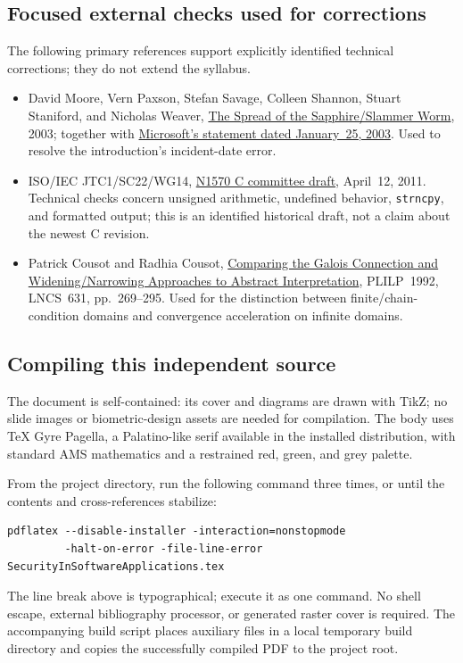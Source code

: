 \documentclass[11pt,a4paper]{article}
\numberwithin{figure}{section}
\begin{document}
\subsection{Focused external checks used for corrections}
The following primary references support explicitly identified technical corrections; they do not extend the syllabus.
\begin{itemize}
\item David Moore, Vern Paxson, Stefan Savage, Colleen Shannon, Stuart Staniford, and Nicholas Weaver, \href{https://www.caida.org/catalog/papers/2003_sapphire/}{The Spread of the Sapphire/Slammer Worm}, 2003; together with \href{https://news.microsoft.com/source/2003/01/25/microsoft-statement-on-the-slammer-worm-attack/}{Microsoft's statement dated January~25, 2003}. Used to resolve the introduction's incident-date error.
\item ISO/IEC JTC1/SC22/WG14, \href{https://www.open-std.org/jtc1/sc22/wg14/www/docs/n1570.pdf}{N1570 C committee draft}, April~12, 2011. Technical checks concern unsigned arithmetic, undefined behavior, \texttt{strncpy}, and formatted output; this is an identified historical draft, not a claim about the newest C revision.
\item Patrick Cousot and Radhia Cousot, \href{https://www.di.ens.fr/~cousot/COUSOTpapers/PLILP92.shtml}{Comparing the Galois Connection and Widening/Narrowing Approaches to Abstract Interpretation}, PLILP~1992, LNCS~631, pp.~269--295. Used for the distinction between finite/chain-condition domains and convergence acceleration on infinite domains.
\end{itemize}

\subsection{Compiling this independent source}
The document is self-contained: its cover and diagrams are drawn with TikZ; no slide images or biometric-design assets are needed for compilation. The body uses TeX Gyre Pagella, a Palatino-like serif available in the installed distribution, with standard AMS mathematics and a restrained red, green, and grey palette.

From the project directory, run the following command three times, or until the contents and cross-references stabilize:
\begin{lstlisting}
pdflatex --disable-installer -interaction=nonstopmode
         -halt-on-error -file-line-error SecurityInSoftwareApplications.tex
\end{lstlisting}
The line break above is typographical; execute it as one command. No shell escape, external bibliography processor, or generated raster cover is required. The accompanying build script places auxiliary files in a local temporary build directory and copies the successfully compiled PDF to the project root.
\end{document}

